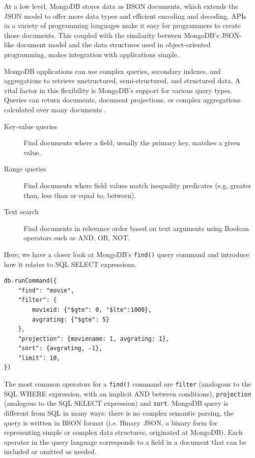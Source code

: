 At a low level, MongoDB stores data as BSON documents, which extends the JSON model to offer more data types and efficient encoding and decoding. APIs in a variety of programming languages make it easy for programmers to create those documents. This coupled with the similarity between MongoDB's JSON-like document model and the data structures used in object-oriented programming, makes integration with applications simple. 

MongoDB applications can use complex queries, secondary indexes, and aggregations to retrieve unstructured, semi-structured, and structured data. A vital factor in this flexibility is MongoDB's support for various query types. Queries can return documents, document projections, or complex aggregations calculated over
many documents \cite{mongodb_2019}.

\begin{description}
     \item[Key-value queries] Find documents where a field, usually the primary key, matches a given value.
     \item[Range queries] Find documents where field values match inequality predicates (e.g, greater than, less than or equal to, between).
     \item[Text search] Find documents in relevance order based on text arguments using Boolean operators such as AND, OR, NOT.
\end{description}

Here, we have a closer look at MongoDB's \verb|find()| query command and introduce
how it relates to SQL SELECT expressions.
\begin{lstlisting}[caption={MongoDB find() query example}, label={alg:queryexample}]
db.runCommand({
    "find": "movie",
    "filter": { 
        movieid: {"$gte": 0, "$lte":1000}, 
        avgrating: {"$gte": 5} 
    },
    "projection": {moviename: 1, avgrating: 1},
    "sort": {avgrating, -1},
    "limit": 10,
})
\end{lstlisting}

The most common operators for a \verb|find()| command are \verb|filter| (analogous to the SQL WHERE expression, with an implicit AND between conditions), \verb|projection| (analogous to the SQL SELECT expression) and \verb|sort|. MongoDB query is different from SQL in many ways: there is no complex semantic parsing, the query is written in BSON format (i.e. Binary~JSON, a binary form for representing simple or complex data structures, originated at MongoDB). Each operator in the query language corresponds to a field in a document that can be included or omitted as needed.

